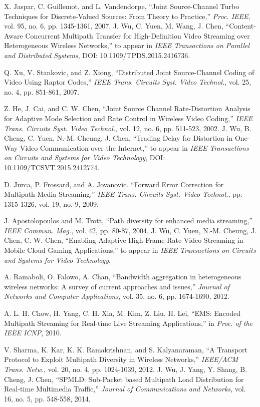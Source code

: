 \documentclass[journal]{IEEEtran}
\begin{document}
\begin{thebibliography}{1}
X. Jaspar, C. Guillemot, and L. Vandendorpe, ``Joint Source-Channel Turbo Techniques for Discrete-Valued Sources: From Theory to Practice,'' \emph{Proc. IEEE}, vol. 95, no. 6, pp. 1345-1361, 2007.
J. Wu, C. Yuen, M. Wang, J. Chen, ``Content-Aware Concurrent Multipath Transfer for High-Definition Video Streaming over Heterogeneous Wireless Networks,'' to appear in \emph{IEEE Transactions on Parallel and Distributed Systems}, DOI: 10.1109/TPDS.2015.2416736.

Q. Xu, V. Stankovic, and Z. Xiong, ``Distributed Joint Source-Channel Coding of Video Using Raptor Codes,'' \emph{IEEE Trans. Circuits Syst. Video Technol.}, vol. 25, no. 4, pp. 851-861, 2007.

Z. He, J. Cai, and C. W. Chen, ``Joint Source Channel Rate-Distortion Analysis for Adaptive Mode Selection and Rate Control in Wireless Video Coding,'' \emph{IEEE Trans. Circuits Syst. Video Technol.}, vol. 12, no. 6, pp. 511-523, 2002.
J. Wu, B. Cheng, C. Yuen, N.-M. Cheung, J. Chen, ``Trading Delay for Distortion in One-Way Video Communication over the Internet,'' to appear in \emph{IEEE Transactions on Circuits and Systems for Video Technology}, DOI: 10.1109/TCSVT.2015.2412774.

D. Jurca, P. Frossard, and A. Jovanovic. ``Forward Error Correction for Multipath Media Streaming,'' \emph{IEEE Trans. Circuits Syst. Video Technol.,} pp. 1315-1326, vol. 19, no. 9, 2009.

J. Apostolopoulos and M. Trott, ``Path diversity for enhanced media streaming,'' \emph{IEEE Commun. Mag.}, vol. 42, pp. 80-87, 2004.
J. Wu, C. Yuen, N.-M. Cheung, J. Chen, C. W. Chen, ``Enabling Adaptive High-Frame-Rate Video Streaming in Mobile Cloud Gaming Applications,'' to appear in \emph{IEEE Transactions on Circuits and Systems for Video Technology}.

A. Ramaboli, O. Falowo, A. Chan, ``Bandwidth aggregation in heterogeneous wireless networks: A survey of current approaches and issues,'' \emph{Journal of Networks and Computer Applications}, vol. 35, no. 6, pp. 1674-1690, 2012.

A. L. H. Chow, H. Yang, C. H. Xia, M. Kim, Z. Liu, H. Lei, ``EMS: Encoded Multipath Streaming for Real-time Live Streaming Applications,'' in \emph{Proc. of the IEEE ICNP}, 2010.

V. Sharma, K. Kar, K. K. Ramakrishnan, and S. Kalyanaraman, ``A Transport Protocol to Exploit Multipath Diversity in Wireless Networks,'' \emph{IEEE/ACM Trans. Netw.}, vol. 20, no. 4, pp. 1024-1039, 2012.
J. Wu, J. Yang, Y. Shang, B. Cheng, J. Chen, ``SPMLD: Sub-Packet based Multipath Load Distribution for Real-time Multimedia Traffic,'' \emph{Journal of Communications and Networks}, vol. 16, no. 5, pp. 548-558, 2014.


\end{thebibliography}
\end{document}
